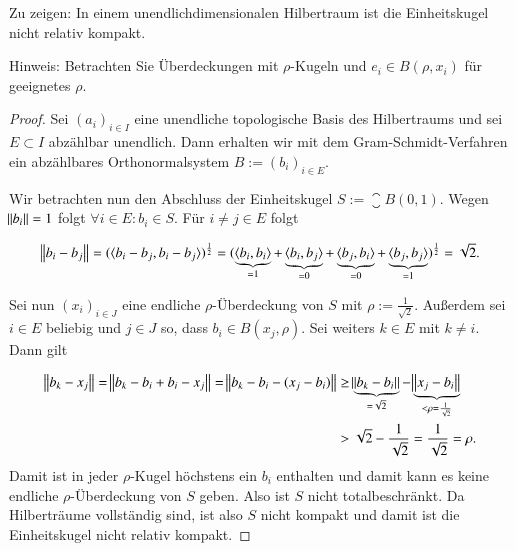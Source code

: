 
\begin{exercise}
  Zu zeigen: In einem unendlichdimensionalen Hilbertraum ist die Einheitskugel nicht relativ kompakt.

  Hinweis: Betrachten Sie Überdeckungen mit $\rho$-Kugeln und $e_i \in B(\rho,x_i)$ für geeignetes $\rho$.
\end{exercise}
\begin{proof}
  Sei ${(a_i)}_{i \in I}$ eine unendliche topologische Basis des Hilbertraums und sei $E \subset I$ ab\-zähl\-bar unendlich. Dann erhalten wir mit dem Gram-Schmidt-Verfahren ein abzählbares Orthonormalsystem $B:={(b_i)}_{i \in E}$.

  Wir betrachten nun den Abschluss der Einheitskugel $S:=\closure{B(0,1)}$. Wegen $\norm{b_i}=1$ folgt $\forall i \in E: b_i \in S$. Für $i \neq j \in E$ folgt

  \begin{equation*}
    \norm{b_i-b_j}={(\langle {b_i-b_j},{b_i-b_j} \rangle)}^{\frac{1}{2}}={(\underbrace{\langle {b_i},{b_i} \rangle}_{=1}+\underbrace{\langle {b_i},{b_j} \rangle}_{=0}+ \underbrace{\langle {b_j},{b_i} \rangle}_{=0} + \underbrace{\langle {b_j},{b_j} \rangle}_{=1})}^{\frac{1}{2}} = \sqrt{2}.
  \end{equation*}

  Sei nun ${(x_i)}_{i \in J}$ eine endliche $\rho$-Überdeckung von $S$ mit $\rho:=\frac{1}{\sqrt{2}}$. Außerdem sei $i \in E$ beliebig und $j \in J$ so, dass $b_i \in B(x_j,\rho)$. Sei weiters $k \in E$ mit $k \neq i$. Dann gilt

  \begin{equation*}
    \begin{split}
      \norm{b_k-x_j}=\norm{b_k-b_i+b_i-x_j}
      =\norm{b_k-b_i-(x_j-b_i)}
      &\geq \underbrace{\norm{b_k-b_i}}_{=\sqrt{2}} - \underbrace{\norm{x_j-b_i}}_{< \rho=\frac{1}{\sqrt{2}}} \\
      &> \sqrt{2}-\frac{1}{\sqrt{2}}=\frac{1}{\sqrt{2}}=\rho.
    \end{split}
  \end{equation*}
  Damit ist in jeder $\rho$-Kugel höchstens ein $b_i$ enthalten und damit kann es keine endliche $\rho$-Überdeckung von $S$ geben. Also ist $S$ nicht totalbeschränkt. Da Hilberträume vollständig sind, ist also $S$ nicht kompakt und damit ist die Einheitskugel nicht relativ kompakt.
\end{proof}

